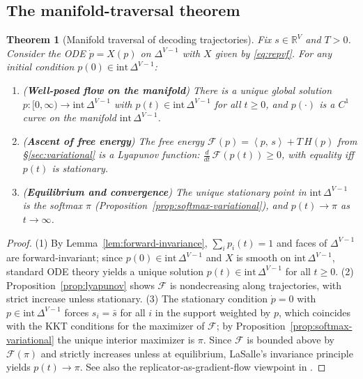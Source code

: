 \documentclass[11pt,reqno]{article}
\numberwithin{equation}{section}
\theoremstyle{plain}
\newtheorem{theorem}{Theorem}[section]
\theoremstyle{definition}
\theoremstyle{remark}
\newcommand{\R}{\mathbb{R}}
\newcommand{\1}{\mathbbm{1}}
\newcommand{\ip}[2]{\left\langle #1,\, #2 \right\rangle}
\newcommand{\Hent}{H}
\newcommand{\simplex}{\Delta^{V-1}}
\newcommand{\avgscore}{\bar{s}}
\begin{document}
\subsection{The manifold-traversal theorem}
\begin{theorem}[Manifold traversal of decoding trajectories]\label{thm:manifold}
Fix $s\in\R^V$ and $T>0$. Consider the ODE $\dot p = X(p)$ on $\simplex$ with $X$ given by \eqref{eq:repvf}.
For any initial condition $p(0)\in \mathrm{int}\,\simplex$:
\begin{enumerate}
    \item (\textbf{Well-posed flow on the manifold}) There is a unique global solution $p:[0,\infty)\to \mathrm{int}\,\simplex$ with $p(t)\in\mathrm{int}\,\simplex$ for all $t\ge 0$, and $p(\cdot)$ is a $C^1$ curve on the manifold $\mathrm{int}\,\simplex$.
    \item (\textbf{Ascent of free energy}) The free energy $\mathcal{F}(p)=\ip{p}{s}+T\,\Hent(p)$ from \S\ref{sec:variational} is a Lyapunov function: $\frac{d}{dt}\,\mathcal{F}(p(t))\ge 0$, with equality iff $p(t)$ is stationary.
    \item (\textbf{Equilibrium and convergence}) The unique stationary point in $\mathrm{int}\,\simplex$ is the softmax $\pi$ (Proposition~\ref{prop:softmax-variational}), and $p(t)\to \pi$ as $t\to\infty$.
\end{enumerate}
\end{theorem}

\begin{proof}
(1) By Lemma~\ref{lem:forward-invariance}, $\sum_i p_i(t)=1$ and faces of $\simplex$ are forward-invariant; since $p(0)\in\mathrm{int}\,\simplex$ and $X$ is smooth on $\mathrm{int}\,\simplex$, standard ODE theory yields a unique solution $p(t)\in\mathrm{int}\,\simplex$ for all $t\ge 0$.
(2) Proposition~\ref{prop:lyapunov} shows $\mathcal{F}$ is nondecreasing along trajectories, with strict increase unless stationary.
(3) The stationary condition $\dot p=0$ with $p\in\mathrm{int}\,\simplex$ forces $s_i=\avgscore$ for all $i$ in the support weighted by $p$, which coincides with the KKT conditions for the maximizer of $\mathcal{F}$; by Proposition~\ref{prop:softmax-variational} the unique interior maximizer is $\pi$. Since $\mathcal{F}$ is bounded above by $\mathcal{F}(\pi)$ and strictly increases unless at equilibrium, LaSalle’s invariance principle yields $p(t)\to \pi$. See also the replicator-as-gradient-flow viewpoint in \citet{shahshahani1979nouvelle,hofbauer1998evolutionary}.
\end{proof}
\end{document}
